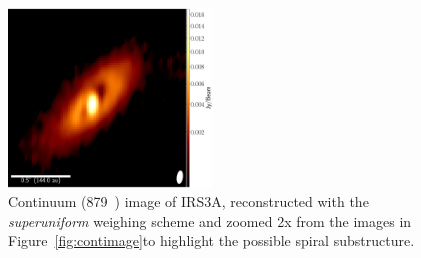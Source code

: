 \begin{figure}[H]
  \begin{center}
   \includegraphics[width=0.48\textwidth]{img/L1448IRS3B_useforsub_widecenter_ms_superuniform_imagesingle_uc-superuniform.pdf} %
   \end{center}
   \caption{Continuum (879~\micron) image of IRS3A, reconstructed with the \textit{superuniform} weighing scheme and zoomed 2x from the images in Figure~\ref{fig:contimage}\space to highlight the possible spiral substructure.} \label{fig:widesuperuniform}
\end{figure}

